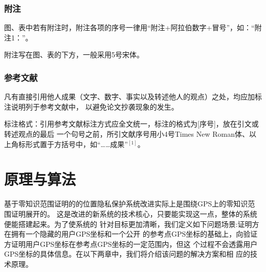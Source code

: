 \documentclass[zihao=-4]{ctexart}
\begin{document}
\begin{spacing}{1.5}
\subsubsection{附注}
图、表中若有附注时，附注各项的序号一律用“附注+阿拉伯数字+冒号”，如：“附注1：”。

附注写在图、表的下方，一般采用5号宋体。

\subsubsection{参考文献}
凡有直接引用他人成果（文字、数字、事实以及转述他人的观点）之处，均应加标注说明列于参考文献中，
以避免论文抄袭现象的发生。

标注格式：引用参考文献标注方式应全文统一，标注的格式为[序号]，放在引文或转述观点的最后
一个句号之前，所引文献序号用小4号Times New Roman体、以上角标形式置于方括号中，如“……成果”$^{[1]}$。

\section{原理与算法}
基于零知识范围证明的的位置隐私保护系统改进实际上是围绕GPS上的零知识范围证明展开的。
这是改进的新系统的技术核心，只要能实现这一点，整体的系统便能搭建起来。为了使系统的
针对目标更加清晰，我们定义如下问题场景:证明方在拥有一个隐藏的用户GPS坐标和一个公开
的参考点GPS坐标的基础上，向验证方证明用户GPS坐标在参考点GPS坐标的一定范围内，但这
个过程不会透露用户GPS坐标的具体信息。在以下两章中，我们将介绍该问题的解决方案和相
应的技术原理。

\end{spacing}
\end{document}

